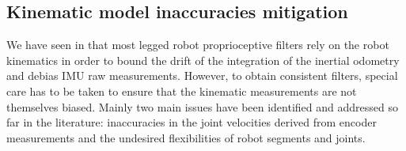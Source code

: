 \subsection{Kinematic model inaccuracies mitigation}


We have seen in  that most legged robot proprioceptive filters rely on the robot kinematics in order to bound the drift of the integration
of the inertial odometry and debias IMU raw measurements. However, to obtain consistent filters, special care has to be taken to ensure that the kinematic
measurements are not themselves biased. Mainly two main issues have been identified and addressed so far in the literature: inaccuracies in the joint velocities derived from
encoder measurements and the undesired flexibilities of robot segments and joints.


